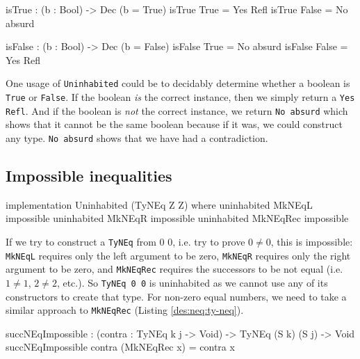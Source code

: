         \begin{code}[caption={Using \texttt{absurd}}]
        isTrue : (b : Bool) -> Dec (b = True)
        isTrue True  = Yes Refl
        isTrue False = No absurd
        
        isFalse : (b : Bool) -> Dec (b = False)
        isFalse True  = No absurd
        isFalse False = Yes Refl
        \end{code}
        
        One usage of \texttt{Uninhabited} could be to decidably determine whether a boolean is \texttt{True} or \texttt{False}. If the boolean \textit{is} the correct instance, then we simply return a \texttt{Yes Refl}. And if the boolean is \textit{not} the correct instance, we return \texttt{No absurd} which shows that it cannot be the same boolean because if it was, we could construct any type. \texttt{No absurd} shows that we have had a contradiction.
    
    \subsection{Impossible inequalities}    
        \begin{code}[label={des:neq-uninh}, caption={Not equals cannot be constructed on 0 0}]
        implementation Uninhabited (TyNEq Z Z) where
            uninhabited MkNEqL   impossible
            uninhabited MkNEqR   impossible
            uninhabited MkNEqRec impossible
        \end{code}
    
        If we try to construct a \texttt{TyNEq} from 0 0, i.e. try to prove $0 \neq 0$, this is impossible: \texttt{MkNEqL} requires only the left argument to be zero, \texttt{MkNEqR} requires only the right argument to be zero, and \texttt{MkNEqRec} requires the successors to be not equal (i.e. $1 \neq 1$, $2 \neq 2$, etc.). So \texttt{TyNEq 0 0} is uninhabited as we cannot use any of its constructors to create that type. For non-zero equal numbers, we need to take a similar approach to \texttt{MkNEqRec} (Listing \ref{des:neq:ty-neq}).
        
        \begin{code}[label={des:neq-sneqimp}, caption={Proving inequality of numbers is impossible}]
        succNEqImpossible : (contra : TyNEq k j -> Void) ->
                            TyNEq (S k) (S j) -> Void   
        succNEqImpossible contra (MkNEqRec x) = contra x
        \end{code}
    
